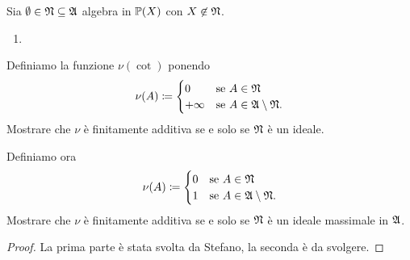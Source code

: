 \documentclass[../EserciziIstituzioniAnalisi.tex]{subfiles}
\begin{document}
\begin{exercise}[13/10/2016]
  Sia $\emptyset \in \mathfrak N \subseteq \mathfrak A$ algebra in $\mathbb P(X)$ con $X \not\in \mathfrak N$.
  \begin{enumerate}
  \item 
  \end{enumerate}
  Definiamo la funzione $\nu(\cot)$ ponendo 
  \begin{equation*}
    \nu(A) \coloneqq
    \begin{cases}
      0 & \text{se $A \in \mathfrak N$}\\
      +\infty & \text{se $A \in \mathfrak A\setminus \mathfrak N$}.
    \end{cases}
  \end{equation*}
  Mostrare che $\nu$ \`e finitamente additiva se e solo se $\mathfrak N$ \`e un ideale. 
\item Definiamo ora
  \begin{equation*}
    \nu(A) \coloneqq
    \begin{cases}
      0 & \text{se $A \in \mathfrak N$}\\
      1 & \text{se $A \in \mathfrak A\setminus \mathfrak N$}.
    \end{cases}
  \end{equation*}
  Mostrare che $\nu$ è finitamente additiva se e solo se $\mathfrak N$ è un ideale massimale in $\mathfrak A$.
\end{exercise}
\begin{proof}
La prima parte è stata svolta da Stefano, la seconda è da svolgere.
\end{proof}
\end{document}

